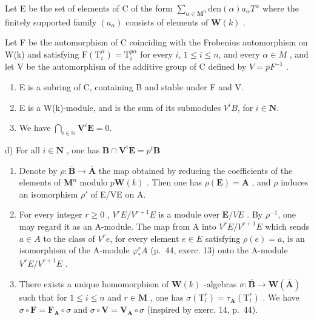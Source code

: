 Let E be the set of elements of C of the form \(\sum_{\alpha \in \mathbf{M}^n} \text{den}(\alpha) a_\alpha T^\alpha\) where the finitely supported family \((a_\alpha)\) consists of elements of \(\mathbf{W}(k)\) .

Let F be the automorphism of C coinciding with the Frobenius automorphism on W(k) and satisfying \(\mathrm{F}(\mathrm{T}_{i}^{\alpha}) = \mathrm{T}_{i}^{p\alpha}\) for every \(i\), \(1 \leqslant i \leqslant n\), and every \(\alpha \in M\) , and let V be the automorphism of the additive group of C defined by \(V = pF^{-1}\) .

\begin{enumerate}
\def\labelenumi{\alph{enumi})}
\item
  E is a subring of C, containing B and stable under F and V.
\item
  E is a W(k)-module, and is the sum of its submodules \(V^iB\), for \(i \in \mathbf{N}\).
\item
  We have \(\bigcap_{i\in\mathbb{N}}\mathbf{V}^{i}\mathbf{E} = 0\).
\end{enumerate}

d) For all \(i\in \mathbf{N}\) , one has \(\mathbf{B}\cap \mathbf{V}^i\mathbf{E} = p^i\mathbf{B}\)

\begin{enumerate}
\def\labelenumi{\alph{enumi})}
\setcounter{enumi}{4}
\item
  Denote by \(\rho: \overline{\mathbf{B}} \to \overline{\mathbf{A}}\) the map obtained by reducing the coefficients of the elements of \(\mathbf{M}^n\) modulo \(p\mathbf{W}(k)\) . Then one has \(\rho(\mathbf{E}) = \mathbf{A}\) , and \(\rho\) induces an isomorphism \(\rho'\) of E/VE on A.
\item
  For every integer \(r \geqslant 0\) , \(V^r E / V^{r+1}E\) is a module over \(\mathbf{E} / VE\) . By \(\rho^{-1}\), one may regard it as an A-module. The map from A into \(V^r E / V^{r+1}E\) which sends \(a \in A\) to the class of \(V^r e\), for every element \(e \in E\) satisfying \(\rho(e) = a\), is an isomorphism of the A-module \(\varphi_*^r A\) (p.~44, exerc. 13) onto the A-module \(V^r E / V^{r+1}E\) .
\item
  There exists a unique homomorphism of \(\mathbf{W}(k)\) -algebras \(\sigma: \overline{\mathbf{B}} \to \mathbf{W}(\overline{\mathbf{A}})\) such that for \(1 \leqslant i \leqslant n\) and \(r \in \mathbf{M}\) , one has \(\sigma(\mathrm{T}_i^r) = \tau_{\overline{\mathbf{A}}}(\mathrm{T}_i^r)\) . We have \(\sigma \circ \mathbf{F} = \mathbf{F}_{\overline{\mathbf{A}}} \circ \sigma\) and \(\sigma \circ \mathbf{V} = \mathbf{V}_{\overline{\mathbf{A}}} \circ \sigma\) (inspired by exerc. 14, p.~44).
\end{enumerate}

